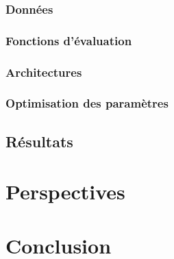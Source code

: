 \documentclass{report}
\begin{document}
		\subsection{Données}
			
		\subsection{Fonctions d'évaluation}
				
		\subsection{Architectures}
			
		\subsection{Optimisation des paramètres}
			
		
	\section{Résultats}
		


\chapter{Perspectives}
	

\chapter*{Conclusion}
	






\addappheadtotoc
\appendixpage

\appendix


\end{document}
